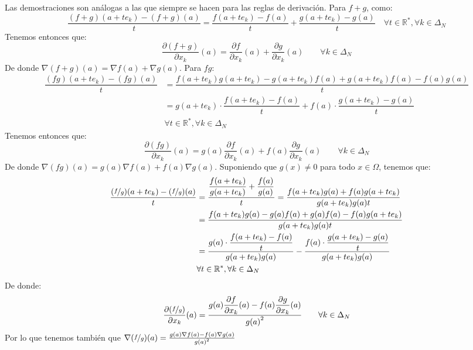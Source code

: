 \begin{ejercicio}
    \noindent
    Las demostraciones son análogas a las que siempre se hacen para las reglas de derivación. Para $f+g$, como:
    \begin{equation*}
        \dfrac{(f+g)(a+te_k) - (f+g)(a)}{t} = \dfrac{f(a+te_k)-f(a)}{t}+\dfrac{g(a+te_k)-g(a)}{t} \quad \forall t\in \mathbb{R}^\ast, \forall k\in \Delta_N
    \end{equation*}
    Tenemos entonces que:
    \begin{equation*}
        \dfrac{\partial (f+g)}{\partial x_k}(a) = \dfrac{\partial f}{\partial x_k}(a) + \dfrac{\partial g}{\partial x_k}(a) \qquad \forall k\in \Delta_N
    \end{equation*}
    De donde $\nabla(f+g)(a) = \nabla f(a) + \nabla g(a)$. Para $fg$:
    \begin{align*}
        \dfrac{(fg)(a+te_k) - (fg)(a)}{t} &= \dfrac{f(a+te_k)g(a+te_k) - g(a+te_k)f(a) + g(a+te_k)f(a) - f(a)g(a)}{t} \\
                                          &= g(a+te_k)\cdot \dfrac{f(a+te_k)-f(a)}{t} + f(a) \cdot \dfrac{g(a+te_k)-g(a)}{t} \\ &\forall t\in \mathbb{R}^\ast, \forall k\in \Delta_N
    \end{align*}
    Tenemos entonces que:
    \begin{equation*}
        \dfrac{\partial (fg)}{\partial x_k} (a) = g(a)\dfrac{\partial f}{\partial x_k}(a) + f(a) \dfrac{\partial g}{\partial x_k}(a) \qquad \forall k\in \Delta_N
    \end{equation*}
    De donde $\nabla(fg)(a) = g(a)\nabla f(a) + f(a)\nabla g(a)$. Suponiendo que $g(x) \neq 0$ para todo $x\in \Omega$, tenemos que:
    \begin{align*}
        \dfrac{(\nicefrac{f}{g})(a+te_k) - (\nicefrac{f}{g})(a)}{t} &= \dfrac{\dfrac{f(a+te_k)}{g(a+te_k)} + \dfrac{f(a)}{g(a)}}{t} = \dfrac{f(a+te_k)g(a) + f(a)g(a+te_k)}{g(a+te_k)g(a)t} \\
                                                                    &= \dfrac{f(a+te_k)g(a) - g(a)f(a) + g(a)f(a) - f(a)g(a+te_k)}{g(a+te_k)g(a)t}  \\
                                                                    &= \dfrac{g(a) \cdot \dfrac{f(a+te_k)-f(a)}{t}}{g(a+te_k)g(a)} - \dfrac{f(a) \cdot \dfrac{g(a+te_k)-g(a)}{t}}{g(a+te_k)g(a)} \\
                                                                    & \forall t\in \mathbb{R}^\ast, \forall k\in \Delta_N
    \end{align*}
    De donde:
    \begin{equation*}
        \dfrac{\partial (\nicefrac{f}{g})}{\partial x_k}(a) = \dfrac{g(a) \dfrac{\partial f}{\partial x_k}(a) - f(a)\dfrac{\partial g}{\partial x_k}(a)}{{g(a)}^{2}} \qquad \forall k\in \Delta_N
    \end{equation*}
    Por lo que tenemos también que $\nabla(\nicefrac{f}{g})(a) = \frac{g(a) \nabla f(a) - f(a) \nabla g(a)}{{g(a)}^{2}}$
\end{ejercicio}

